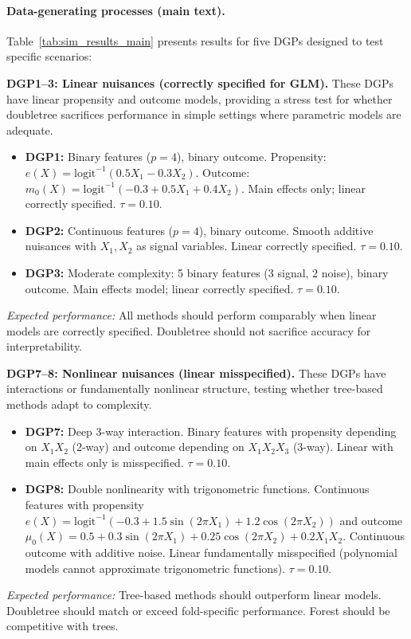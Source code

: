 \documentclass[12pt]{article}
\begin{document}
\paragraph{Data-generating processes (main text).}
Table~\ref{tab:sim_results_main} presents results for five DGPs designed to test specific scenarios:

\textbf{DGP1--3: Linear nuisances (correctly specified for GLM).}
These DGPs have linear propensity and outcome models, providing a stress test for whether doubletree sacrifices performance in simple settings where parametric models are adequate.
\begin{itemize}[nosep]
\item \textbf{DGP1:} Binary features ($p = 4$), binary outcome. Propensity: $e(X) = \text{logit}^{-1}(0.5 X_1 - 0.3 X_2)$. Outcome: $m_0(X) = \text{logit}^{-1}(-0.3 + 0.5 X_1 + 0.4 X_2)$. Main effects only; linear correctly specified. $\tau = 0.10$.
\item \textbf{DGP2:} Continuous features ($p = 4$), binary outcome. Smooth additive nuisances with $X_1, X_2$ as signal variables. Linear correctly specified. $\tau = 0.10$.
\item \textbf{DGP3:} Moderate complexity: 5 binary features (3 signal, 2 noise), binary outcome. Main effects model; linear correctly specified. $\tau = 0.10$.
\end{itemize}
\emph{Expected performance:} All methods should perform comparably when linear models are correctly specified. Doubletree should not sacrifice accuracy for interpretability.

\textbf{DGP7--8: Nonlinear nuisances (linear misspecified).}
These DGPs have interactions or fundamentally nonlinear structure, testing whether tree-based methods adapt to complexity.
\begin{itemize}[nosep]
\item \textbf{DGP7:} Deep 3-way interaction. Binary features with propensity depending on $X_1 X_2$ (2-way) and outcome depending on $X_1 X_2 X_3$ (3-way). Linear with main effects only is misspecified. $\tau = 0.10$.
\item \textbf{DGP8:} Double nonlinearity with trigonometric functions. Continuous features with propensity $e(X) = \text{logit}^{-1}(-0.3 + 1.5 \sin(2\pi X_1) + 1.2 \cos(2\pi X_2))$ and outcome $\mu_0(X) = 0.5 + 0.3 \sin(2\pi X_1) + 0.25 \cos(2\pi X_2) + 0.2 X_1 X_2$. Continuous outcome with additive noise. Linear fundamentally misspecified (polynomial models cannot approximate trigonometric functions). $\tau = 0.10$.
\end{itemize}
\emph{Expected performance:} Tree-based methods should outperform linear models. Doubletree should match or exceed fold-specific performance. Forest should be competitive with trees.
\end{document}
